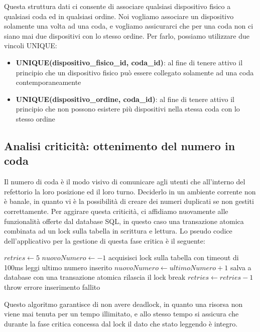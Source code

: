 \documentclass[a4paper, titlepage, 12pt, openright, twoside]{book}
\begin{document}
Questa struttura dati ci consente di associare qualsiasi dispositivo fisico a qualsiasi coda ed in qualsiasi ordine. Noi vogliamo associare un dispositivo solamente una volta ad una coda, e vogliamo assicurarci che per una coda non ci siano mai due dispositivi con lo stesso ordine. Per farlo, possiamo utilizzare due vincoli UNIQUE:
\begin{itemize}
	\item \textbf{UNIQUE(dispositivo\_fisico\_id, coda\_id)}: al fine di tenere attivo il principio che un dispositivo fisico può essere collegato solamente ad una coda contemporaneamente
	\item \textbf{UNIQUE(dispositivo\_ordine, coda\_id)}: al fine di tenere attivo il principio che non possono esistere più dispositivi nella stessa coda con lo stesso ordine
\end{itemize}

\subsection{Analisi criticità: ottenimento del numero in coda}

Il numero di coda è il modo visivo di comunicare agli utenti che all'interno del refettorio la loro posizione ed il loro turno. Deciderlo in un ambiente corrente non è banale, in quanto vi è la possibilità di creare dei numeri duplicati se non gestiti correttamente. Per aggirare questa criticità, ci affidiamo nuovamente alle funzionalità offerte dal database SQL, in questo caso una transazione atomica combinata ad un lock sulla tabella in scrittura e lettura. Lo pseudo codice dell'applicativo per la gestione di questa fase critica è il seguente:

\begin{algorithmic}[1]
\State $retries \gets 5$
\State $nuovoNumero \gets -1$
\State acquisisci lock sulla tabella con timeout di 100ms
\State leggi ultimo numero inserito
\State $nuovoNumero \gets ultimoNumero + 1$
\State salva a database con una transazione atomica
\State rilascia il lock
\State break
\Else
\State $retries \gets retries - 1$
\EndIf
\EndWhile
{}
\State throw errore inserimento fallito
\EndIf
\end{algorithmic}

Questo algoritmo garantisce di non avere deadlock, in quanto una risorsa non viene mai tenuta per un tempo illimitato, e allo stesso tempo si assicura che durante la fase critica concessa dal lock il dato che stato leggendo è integro.
\end{document}
